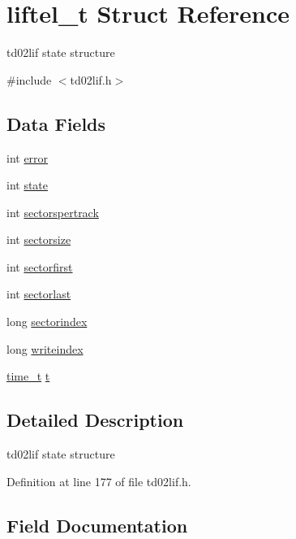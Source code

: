 \hypertarget{structliftel__t}{}\section{liftel\+\_\+t Struct Reference}
\label{structliftel__t}


td02lif state structure  




{\ttfamily \#include $<$td02lif.\+h$>$}

\subsection*{Data Fields}
\begin{DoxyCompactItemize}
\item 
int \hyperlink{structliftel__t_abc69ee3835be72037c41a11b7457cecd}{error}
\item 
int \hyperlink{structliftel__t_a579b9a2411fc6cf4bcdd4cac15d48e49}{state}
\item 
int \hyperlink{structliftel__t_a69b69f0cd2e8f0017178bafd5a7a7585}{sectorspertrack}
\item 
int \hyperlink{structliftel__t_aaf7b830b7b2791c56c83082bb9dba7d9}{sectorsize}
\item 
int \hyperlink{structliftel__t_a28dddd09745822ae834b073ad3c3bd98}{sectorfirst}
\item 
int \hyperlink{structliftel__t_aae9fb3e37531df4dfdf0b2906ec95026}{sectorlast}
\item 
long \hyperlink{structliftel__t_a13e9f8b2e23d8f028f456d4465beb4d5}{sectorindex}
\item 
long \hyperlink{structliftel__t_a3c5f11408ea86ded8a0bc0d20a0ea689}{writeindex}
\item 
\hyperlink{time_8h_a3346b04b0420b32ccf6b706551b70762}{time\+\_\+t} \hyperlink{structliftel__t_a19ad0aafb060bc0262c7946220f0c407}{t}
\end{DoxyCompactItemize}


\subsection{Detailed Description}
td02lif state structure 

Definition at line 177 of file td02lif.\+h.



\subsection{Field Documentation}
